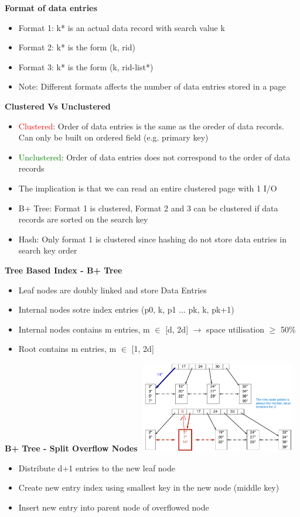 \documentclass[10pt, landscape]{article}
\begin{document}
\begin{multicols}{4}
\textbf{Format of data entries}
\begin{itemize}
  \item Format 1: k* is an actual data record with search value k
  \item Format 2: k* is the form (k, rid)
  \item Format 3: k* is the form (k, rid-list*)
  \item Note: Different formats affects the number of data entries stored in a page
\end{itemize}

\textbf{Clustered Vs Unclustered}
\begin{itemize}
  \item \textcolor{red}{Clustered}: Order of data entries is the same as the oreder of data records. Can only be built on ordered field (e.g. primary key)
  \item \textcolor{green}{Unclustered}: Order of data entries does not correspond to the order of data records
  \item The implication is that we can read an entire clustered page with 1 I/O
  \item  B+ Tree: Format 1 is clustered, Format 2 and 3 can be clustered if data records are sorted on the search key
  \item Hash: Only format 1 is clustered since hashing do not store data entries in search key order
\end{itemize}

\textbf{Tree Based Index - B+ Tree}
\begin{itemize}
  \item Leaf nodes are doubly linked and store Data Entries
  \item Internal nodes sotre index entries (p0, k, p1 ... pk, k, pk+1)
  \item Internal nodes contains m entries,  m $\in$ [d, 2d] $\rightarrow$ space utilisation $\geq$ 50\%
  \item Root contains m entries, m $\in$ [1, 2d]
\end{itemize}

\textbf{B+ Tree - Split Overflow Nodes}
\includegraphics[width=7cm, height=4cm]{split_overflow_node.png}
\begin{itemize}
  \item Distribute d+1 entries to the new leaf node
  \item Create new entry index using smallest key in the new node (middle key)
  \item Insert new entry into parent node of overflowed node
\end{itemize}


\end{multicols}
\end{document}

